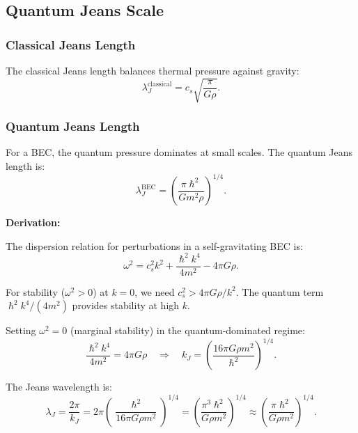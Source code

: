 \documentclass[11pt,a4paper]{article}
\newcommand{\hbar}{\ensuremath{\hslash}}
\theoremstyle{definition}
\theoremstyle{remark}
\begin{document}
\subsection{Quantum Jeans Scale}
\label{sec:jeans_scale}

\subsubsection{Classical Jeans Length}

The classical Jeans length balances thermal pressure against gravity:
\begin{equation}
\lambda_J^{\mathrm{classical}} = c_s \sqrt{\frac{\pi}{G\rho}}.
\end{equation}

\subsubsection{Quantum Jeans Length}

For a BEC, the quantum pressure dominates at small scales. The quantum Jeans length is:
\begin{equation}
\label{eq:quantum_jeans}
\boxed{\lambda_J^{\mathrm{BEC}} = \left(\frac{\pi\hbar^2}{G m^2 \rho}\right)^{1/4}.}
\end{equation}

\textbf{Derivation:}

The dispersion relation for perturbations in a self-gravitating BEC is:
\begin{equation}
\omega^2 = c_s^2 k^2 + \frac{\hbar^2 k^4}{4m^2} - 4\pi G\rho.
\end{equation}

For stability ($\omega^2 > 0$) at $k = 0$, we need $c_s^2 > 4\pi G\rho/k^2$. The quantum term $\hbar^2 k^4/(4m^2)$ provides stability at high $k$.

Setting $\omega^2 = 0$ (marginal stability) in the quantum-dominated regime:
\begin{equation}
\frac{\hbar^2 k^4}{4m^2} = 4\pi G\rho \quad \Rightarrow \quad k_J = \left(\frac{16\pi G\rho m^2}{\hbar^2}\right)^{1/4}.
\end{equation}

The Jeans wavelength is:
\begin{equation}
\lambda_J = \frac{2\pi}{k_J} = 2\pi \left(\frac{\hbar^2}{16\pi G\rho m^2}\right)^{1/4} = \left(\frac{\pi^3\hbar^2}{G\rho m^2}\right)^{1/4} \approx \left(\frac{\pi\hbar^2}{G\rho m^2}\right)^{1/4}.
\end{equation}
\end{document}
